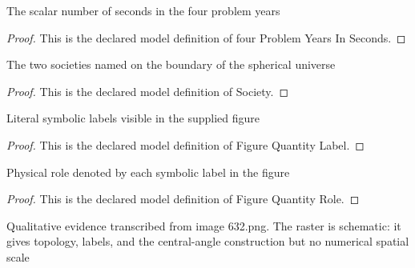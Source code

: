\begin{definition}
  \label{def:physics:phyx-mini-0632:phyxminiproblems-problemphyxmini0632-fourproblemyearsinseconds}
  The scalar number of seconds in the four problem years
\end{definition}
\begin{proof}
  This is the declared model definition of four Problem Years In Seconds.
\end{proof}
\begin{definition}[Society]
  \label{def:physics:phyx-mini-0632:phyxminiproblems-problemphyxmini0632-society}
  The two societies named on the boundary of the spherical universe
\end{definition}
\begin{proof}
  This is the declared model definition of Society.
\end{proof}
\begin{definition}
  \label{def:physics:phyx-mini-0632:phyxminiproblems-problemphyxmini0632-figurequantitylabel}
  Literal symbolic labels visible in the supplied figure
\end{definition}
\begin{proof}
  This is the declared model definition of Figure Quantity Label.
\end{proof}
\begin{definition}
  \label{def:physics:phyx-mini-0632:phyxminiproblems-problemphyxmini0632-figurequantityrole}
  Physical role denoted by each symbolic label in the figure
\end{definition}
\begin{proof}
  This is the declared model definition of Figure Quantity Role.
\end{proof}
\begin{definition}
  \label{def:physics:phyx-mini-0632:phyxminiproblems-problemphyxmini0632-expandingsphericaluniversefigure}
  Qualitative evidence transcribed from image 632.png. The raster is schematic: it gives topology, labels, and the central-angle construction but no numerical spatial scale
\end{definition}
